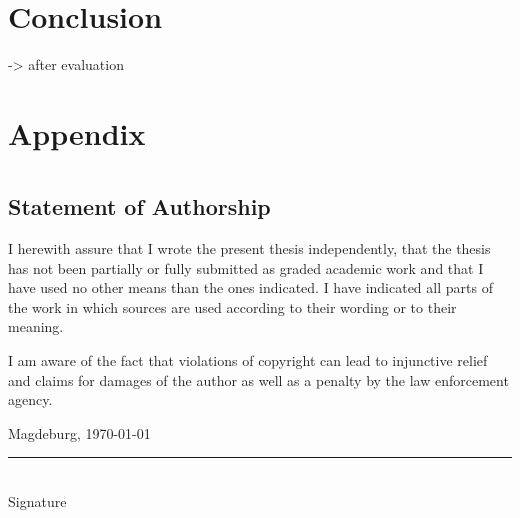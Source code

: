 \documentclass[
	12pt,
	a4paper,
	abstract,
	bibliography=totoc,
	chapterprefix,
	headings=openright,
	numbers=endperiod,
	parskip=half,
	twoside,
]{scrreprt}
\begin{document}
\chapter{Conclusion}
\label{cha:conclusion}

-> after evaluation








\appendix

\chapter{Appendix}
\label{cha:appendix}


\chapter*{}

\section*{Statement of Authorship}

I herewith assure that I wrote the present thesis independently, that the thesis has not been partially or fully submitted as graded academic work and that I have used no other means than the ones indicated.
I have indicated all parts of the work in which sources are used according to their wording or to their meaning.

I am aware of the fact that violations of copyright can lead to injunctive relief and claims for damages of the author as well as a penalty by the law enforcement agency.

\bigskip

Magdeburg, \today

\bigskip
\bigskip

\rule{0.5\textwidth}{0.5pt}\\
\hspace*{0.25em}Signature
\end{document}
